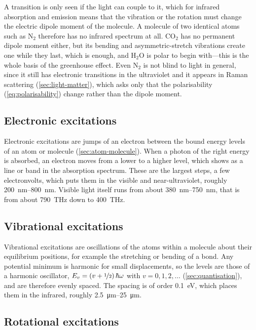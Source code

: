     A transition is only seen if the light can couple to it, which for infrared absorption and emission means that the vibration or the rotation must change the electric dipole moment of the molecule. A molecule of two identical atoms such as N$_{2}$ therefore has no infrared spectrum at all. CO$_{2}$ has no permanent dipole moment either, but its bending and asymmetric-stretch vibrations create one while they last, which is enough, and H$_{2}$O is polar to begin with---this is the whole basis of the greenhouse effect. Even N$_{2}$ is not blind to light in general, since it still has electronic transitions in the ultraviolet and it appears in Raman scattering (\cref{sec:light-matter}), which asks only that the polarisability (\cref{eq:polarisability}) change rather than the dipole moment.
 
    \subsection{Electronic excitations}
 
        Electronic excitations are jumps of an electron between the bound energy levels of an atom or molecule (\cref{sec:atom-molecule}). When a photon of the right energy is absorbed, an electron moves from a lower to a higher level, which shows as a line or band in the absorption spectrum. These are the largest steps, a few electronvolts, which puts them in the visible and near-ultraviolet, roughly \qtyrange{200}{800}{\nano\metre}. Visible light itself runs from about \qtyrange{380}{750}{\nano\metre}, that is from about \qty{790}{\tera\hertz} down to \qty{400}{\tera\hertz}.
 
    \subsection{Vibrational excitations}
 
        Vibrational excitations are oscillations of the atoms within a molecule about their equilibrium positions, for example the stretching or bending of a bond. Any potential minimum is harmonic for small displacements, so the levels are those of a harmonic oscillator, $E_{v} = \left(v+\nicefrac{1}{2}\right)\hbar\omega$ with $v = 0,1,2,\dots$ (\cref{sec:quantisation}), and are therefore evenly spaced. The spacing is of order \qty{0.1}{\electronvolt}, which places them in the infrared, roughly \qtyrange{2.5}{25}{\micro\metre}.
 
    \subsection{Rotational excitations}
 
